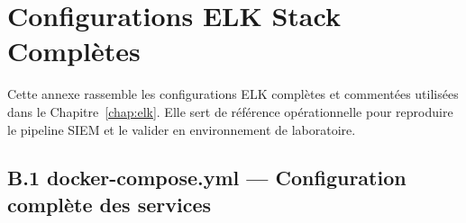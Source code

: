\documentclass[12pt,a4paper,openany]{report}
\begin{document}
	\chapter{Configurations ELK Stack Complètes}
	\label{app:elk-complet}
	
	\begin{tcolorbox}[colback=primary!5!white, colframe=primary, title=\textbf{Annexe B — Configurations ELK Stack Complètes}]
		Cette annexe rassemble les configurations ELK complètes et commentées utilisées dans le Chapitre~\ref{chap:elk}. Elle sert de référence opérationnelle pour reproduire le pipeline SIEM et le valider en environnement de laboratoire.
	\end{tcolorbox}
	
	\section{B.1 docker-compose.yml — Configuration complète des services}
	\label{sec:annexe-b-docker}
	
\end{document}
